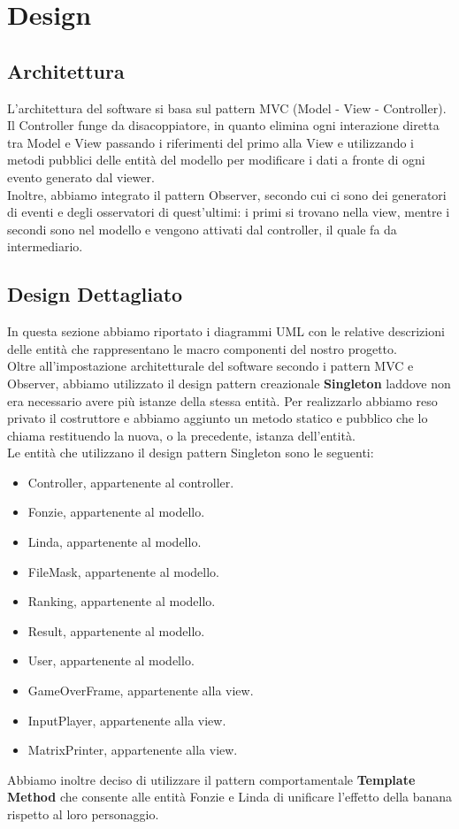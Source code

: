 \documentclass[12pt, letterpaper]{article}
\begin{document}
\section{Design}
    \subsection{Architettura}
        L'architettura del software si basa sul pattern MVC (Model - View - Controller).
        Il Controller funge da disacoppiatore, in quanto elimina ogni interazione diretta tra Model e View passando i riferimenti del primo alla View e utilizzando i metodi pubblici delle entità del modello per modificare i dati a fronte di ogni evento generato dal viewer.\\
        Inoltre, abbiamo integrato il  pattern Observer, secondo cui ci sono dei generatori di eventi e degli osservatori di quest'ultimi: i primi si trovano nella view, mentre i secondi sono nel modello e vengono attivati dal controller, il quale fa da intermediario.
    \newpage
    \subsection{Design Dettagliato}
        In questa sezione abbiamo riportato i diagrammi UML con le relative descrizioni delle entità che rappresentano le macro componenti del nostro progetto. \\
        Oltre all'impostazione architetturale del software secondo i pattern MVC e Observer, abbiamo utilizzato il design pattern creazionale \textbf{Singleton} laddove non era necessario avere più istanze della stessa entità. Per realizzarlo abbiamo reso privato il costruttore e abbiamo aggiunto un metodo statico e pubblico che lo chiama restituendo la nuova, o la precedente, istanza dell'entità.\\ 
        Le entità che utilizzano il design pattern Singleton sono le seguenti:
        \begin{itemize}
            \item Controller, appartenente al controller.
            \item Fonzie, appartenente al modello.
            \item Linda, appartenente al modello.
            \item FileMask, appartenente al modello.
            \item Ranking, appartenente al modello.
            \item Result, appartenente al modello.
            \item User, appartenente al modello.
            \item GameOverFrame, appartenente alla view.
            \item InputPlayer, appartenente alla view.
            \item MatrixPrinter, appartenente alla view.
        \end{itemize}
        Abbiamo inoltre deciso di utilizzare il pattern comportamentale \textbf{Template Method} che consente alle entità Fonzie e Linda di unificare l'effetto della banana rispetto al loro personaggio.
    \newpage
\end{document}
